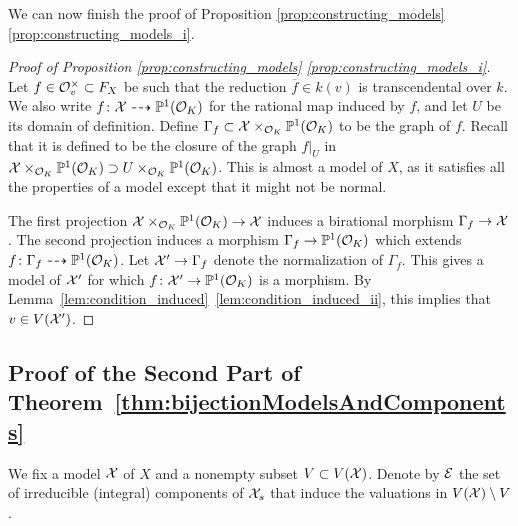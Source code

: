 We can now finish the proof of Proposition \ref{prop:constructing_models} \ref{prop:constructing_models_i}.

\begin{proof}[Proof of Proposition \ref{prop:constructing_models} \ref{prop:constructing_models_i}]
    Let $f \in \mathcal{O}_v^\times \subset F_X$ be such that the reduction $\overline{f} \in k(v)$ is transcendental over $k$.
    We also write $f \colon \mathcal X \dashrightarrow \mathbb P^1(\mathcal O_K )$ for the rational map induced by $f$, and let $U$ be its domain of definition.
    Define $\Gamma_f \subset \mathcal X \times_{\mathcal O_K } \mathbb P^1(\mathcal O_K )$ to be the graph of $f$.
    Recall that it is defined to be the closure of the graph $f|_U$ in $\mathcal X \times_{\mathcal O_K } \mathbb P^1(\mathcal O_K ) \supset U \times_{\mathcal O_K } \mathbb P^1(\mathcal O_K )$.
    This is almost a model of $X$, as it satisfies all the properties of a model except that it might not be normal.
    \begin{center}
    \end{center}
    The first projection $\mathcal X \times_{\mathcal O_K } \mathbb P^1(\mathcal O_K ) \to \mathcal X$ induces a birational morphism $\Gamma_f \to \mathcal X$.
    The second projection induces a morphism $\Gamma_f \to \mathbb P^1(\mathcal O_K )$ which extends $f \colon \Gamma_f \dashrightarrow \mathbb P^1(\mathcal O_K )$.
    Let $\mathcal X' \to \Gamma_f$ denote the normalization of $\Gamma_f$.
    This gives a model of $\mathcal X'$ for which $f \colon \mathcal X' \to \mathbb P^1(\mathcal O_K )$ is a morphism.
    By Lemma~\ref{lem:condition_induced}~\ref{lem:condition_induced_ii}, this implies that $v \in V(\mathcal X')$.
\end{proof}


\subsection{Proof of the Second Part of Theorem~\ref{thm:bijectionModelsAndComponents}}\label{subsec:proof-of-the-second-part}
We fix a model $\mathcal X$ of $X$ and a nonempty subset $V \subset V(\mathcal X)$.
Denote by $\mathcal{E}$ the set of irreducible (integral) components of $\mathcal X_s$ that induce the valuations in $V(\mathcal X)\setminus V$.

